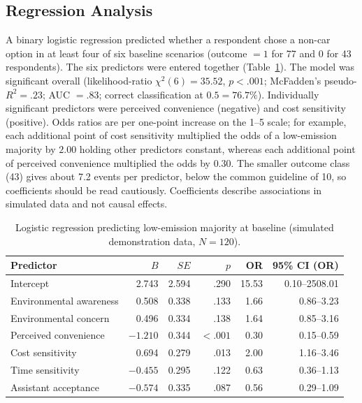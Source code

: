 \documentclass[11pt,a4paper]{article}
\begin{document}
\subsection{Regression Analysis}
A binary logistic regression predicted whether a respondent chose a non-car option in at least four of
six baseline scenarios (outcome $=1$ for 77 and $0$ for 43 respondents). The six predictors were
entered together (Table~\ref{tab:logit}). The model was significant overall (likelihood-ratio
$\chi^2(6) = 35.52$, $p < .001$; McFadden's pseudo-$R^2 = .23$; AUC $= .83$; correct classification at
$0.5 = 76.7\%$). Individually significant predictors were perceived convenience (negative) and cost
sensitivity (positive). Odds ratios are per one-point increase on the 1--5 scale; for example, each
additional point of cost sensitivity multiplied the odds of a low-emission majority by $2.00$ holding
other predictors constant, whereas each additional point of perceived convenience multiplied the odds
by $0.30$. The smaller outcome class (43) gives about 7.2 events per predictor, below the common
guideline of 10, so coefficients should be read cautiously. Coefficients describe associations in
simulated data and not causal effects.

\begin{table}[H]
\centering
\small
\caption{Logistic regression predicting low-emission majority at baseline (simulated demonstration
data, $N = 120$).}
\label{tab:logit}
\begin{tabular}{@{}lrrrrr@{}}
\toprule
\textbf{Predictor} & \textbf{$B$} & \textbf{$SE$} & \textbf{$p$} & \textbf{OR} & \textbf{95\% CI (OR)}\\
\midrule
Intercept & 2.743 & 2.594 & .290 & 15.53 & 0.10--2508.01\\
Environmental awareness & 0.508 & 0.338 & .133 & 1.66 & 0.86--3.23\\
Environmental concern & 0.496 & 0.334 & .138 & 1.64 & 0.85--3.16\\
Perceived convenience & $-1.210$ & 0.344 & $<.001$ & 0.30 & 0.15--0.59\\
Cost sensitivity & 0.694 & 0.279 & .013 & 2.00 & 1.16--3.46\\
Time sensitivity & $-0.455$ & 0.295 & .122 & 0.63 & 0.36--1.13\\
Assistant acceptance & $-0.574$ & 0.335 & .087 & 0.56 & 0.29--1.09\\
\bottomrule
\end{tabular}
\end{table}
\end{document}

